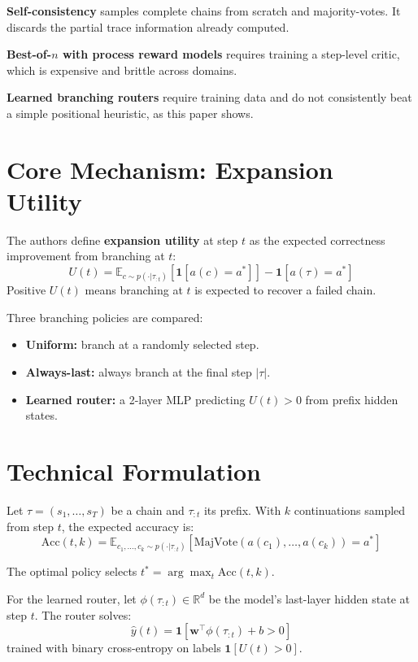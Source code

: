 \documentclass[10pt,twocolumn]{article}
\begin{document}
\textbf{Self-consistency} samples complete chains from scratch and majority-votes.
It discards the partial trace information already computed.

\textbf{Best-of-$n$ with process reward models} requires training a step-level
critic, which is expensive and brittle across domains.

\textbf{Learned branching routers} require training data and do not consistently
beat a simple positional heuristic, as this paper shows.

\section{Core Mechanism: Expansion Utility}

The authors define \textbf{expansion utility} at step $t$ as the expected
correctness improvement from branching at $t$:
\[
U(t) = \mathbb{E}_{c \sim p(\cdot|\tau_{:t})}[\mathbf{1}[a(c)=a^*]]
       - \mathbf{1}[a(\tau)=a^*]
\]
Positive $U(t)$ means branching at $t$ is expected to recover a failed chain.

Three branching policies are compared:
\begin{itemize}[itemsep=2pt,parsep=0pt]
  \item \textbf{Uniform:} branch at a randomly selected step.
  \item \textbf{Always-last:} always branch at the final step $|\tau|$.
  \item \textbf{Learned router:} a 2-layer MLP predicting $U(t)>0$ from
    prefix hidden states.
\end{itemize}

\section{Technical Formulation}

Let $\tau = (s_1, \ldots, s_T)$ be a chain and $\tau_{:t}$ its prefix.
With $k$ continuations sampled from step $t$, the expected accuracy is:
\[
\mathrm{Acc}(t,k) = \mathbb{E}_{c_1,\ldots,c_k \sim p(\cdot|\tau_{:t})}
\!\left[\mathrm{MajVote}(a(c_1),\ldots,a(c_k))=a^*\right]
\]

The optimal policy selects $t^* = \arg\max_t \mathrm{Acc}(t,k)$.

For the learned router, let $\phi(\tau_{:t}) \in \mathbb{R}^d$ be the model's
last-layer hidden state at step $t$. The router solves:
\[
\hat{y}(t) = \mathbf{1}[\mathbf{w}^\top \phi(\tau_{:t}) + b > 0]
\]
trained with binary cross-entropy on labels $\mathbf{1}[U(t)>0]$.
\end{document}
